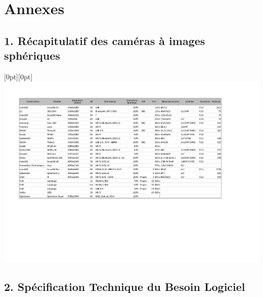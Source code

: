 \appendix
\chapter*{Annexes}
\newpage
\thispagestyle{empty}
\section*{1. Récapitulatif des caméras à images sphériques}

	\raisebox{-200mm}[0pt][0pt]
	{
		\hspace*{-1cm}
		\includegraphics[angle=90,origin=c,scale=0.95]{premade/cameras_360.pdf}
	}
\section*{2. Spécification Technique du Besoin Logiciel}
